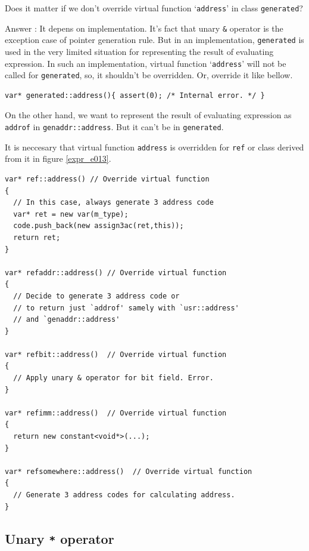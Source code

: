 \begin{QandA}
Does it matter if we don't override virtual function `{\tt{address}}' in
class {\tt{generated}}?

Answer : It depens on implementation. It's fact that
unary {\tt{\&}} operator is the exception case of pointer generation
 rule.
But in an implementation, {\tt{generated}} is used in the very limited
situation for representing the result of evaluating expression.
In such an implementation, virtual function `{\tt{address}}' will not
be called for {\tt{generated}}, so, it shouldn't be overridden.
Or, override it like bellow.
\begin{verbatim}
var* generated::address(){ assert(0); /* Internal error. */ } 
\end{verbatim}
On the other hand, we want to represent the result of evaluating expression
as {\tt{addrof}} in {\tt{genaddr::address}}.
 But it can't be in {\tt{generated}}.
\end{QandA}
It is neccesary that virtual function {\tt{address}} is overridden
for {\tt{ref}} or class derived from it in figure \ref{expr_e013}.
\begin{verbatim}
var* ref::address() // Override virtual function
{
  // In this case, always generate 3 address code
  var* ret = new var(m_type);
  code.push_back(new assign3ac(ret,this));
  return ret;
}

var* refaddr::address() // Override virtual function
{
  // Decide to generate 3 address code or
  // to return just `addrof' samely with `usr::address'
  // and `genaddr::address'
}

var* refbit::address()  // Override virtual function
{
  // Apply unary & operator for bit field. Error.
}

var* refimm::address()  // Override virtual function
{
  return new constant<void*>(...);
}

var* refsomewhere::address()  // Override virtual function
{
  // Generate 3 address codes for calculating address.
}
\end{verbatim}

\subsection{Unary {\tt{*}} operator}
\label{expr_e009}

